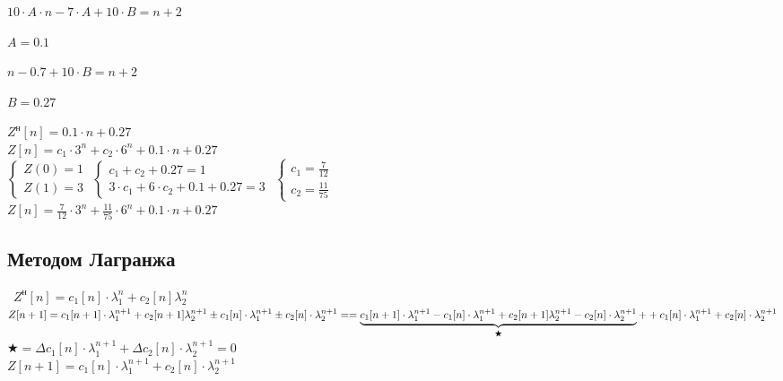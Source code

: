 $10 \cdot A \cdot n - 7 \cdot A + 10 \cdot B = n + 2$

\underline{$A = 0.1$}

$n - 0.7 + 10 \cdot B = n + 2$

\underline{$B = 0.27$}

$Z^{\text{н}}[n] = 0.1 \cdot n + 0.27$\\[0.3cm]

$Z[n] = c_1 \cdot 3^n + c_2 \cdot 6^n +0.1 \cdot n + 0.27$\\[0.3cm]

$
 \begin{cases}
   Z(0) = 1
   \\
   Z(1) = 3
 \end{cases}
$
$
 \begin{cases}
  c_1 + c_2 + 0.27 = 1
   \\
   3 \cdot c_1 + 6 \cdot c_2 + 0.1 + 0.27 = 3
 \end{cases}
$
$
 \begin{cases}
  c_1 = \frac{7}{12}
   \\
   c_2 = \frac{11}{75}
 \end{cases}
$\\[0.5cm]

$Z[n] = \frac{7}{12} \cdot 3^n + \frac{11}{75} \cdot 6^n + 0.1 \cdot n + 0.27$\\[0.5cm]
 

\subsection{Методом Лагранжа}
\
$Z^{\text{н}}[n] = c_1[n] \cdot \lambda_{1}^{n} + c_2[n] \lambda_{2}^{n}$\\[1.5mm]

$Z[n+1] = c_1[n+1] \cdot \lambda_{1}^{n+1} + c_2[n+1] \lambda_{2}^{n+1} \pm c_1[n] \cdot \lambda_{1}^{n+1} \pm c_2[n] \cdot \lambda_{2}^{n+1} =\\[1.5mm] = \underbrace{c_1[n+1] \cdot \lambda_{1}^{n+1} - c_1[n] \cdot \lambda_{1}^{n+1} + c_2[n+1] \lambda_{2}^{n+1} - c_2[n] \cdot \lambda_{2}^{n+1}}_{\bigstar} + \\ + c_1[n] \cdot \lambda_{1}^{n+1} + c_2[n] \cdot \lambda_{2}^{n+1}$\\[1.5mm]

$\bigstar = \Delta c_1[n] \cdot \lambda_1^{n+1} + \Delta c_2[n] \cdot \lambda_2^{n+1} = 0$\\[1.5mm]

$Z[n+1] = c_1[n] \cdot \lambda_1^{n+1} + c_2[n] \cdot \lambda_2^{n+1}$\\[1.5mm]

